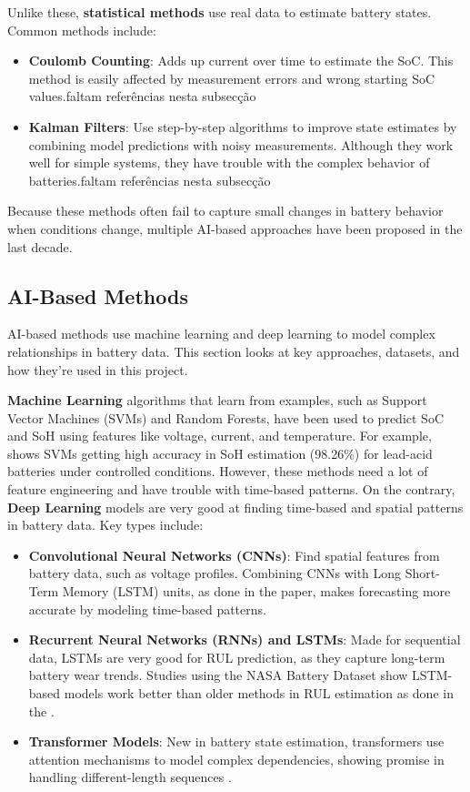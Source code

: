 Unlike these, \textbf{ statistical methods} use real data to estimate battery states. Common methods include:
\begin{itemize}
    \item \textbf{Coulomb Counting}: Adds up current over time to estimate the SoC. This method is easily affected by measurement errors and wrong starting SoC values.\color{Red}faltam referências nesta subsecção\color{Black}
    \item \textbf{Kalman Filters}: Use step-by-step algorithms to improve state estimates by combining model predictions with noisy measurements. Although they work well for simple systems, they have trouble with the complex behavior of batteries.\color{Red}faltam referências nesta subsecção\color{Black}
\end{itemize}

Because these methods often fail to capture small changes in battery behavior when conditions change, multiple AI-based approaches have been proposed in the last decade.

\subsection{AI-Based Methods}
\label{subsec:ai_methods}
AI-based methods use machine learning and deep learning to model complex relationships in battery data. This section looks at key approaches, datasets, and how they're used in this project.

\textbf{Machine Learning} algorithms that learn from examples, such as Support Vector Machines (SVMs) and Random Forests, have been used to predict SoC and SoH using features like voltage, current, and temperature. For example, \cite{sun_simultaneous_2022} shows SVMs getting high accuracy in SoH estimation (98.26\%) for lead-acid batteries under controlled conditions. However, these methods need a lot of feature engineering and have trouble with time-based patterns. On the contrary, \textbf{Deep Learning} models are very good at finding time-based and spatial patterns in battery data. Key types include:
\begin{itemize}
    \item \textbf{Convolutional Neural Networks (CNNs)}: Find spatial features from battery data, such as voltage profiles. Combining CNNs with Long Short-Term Memory (LSTM) units, as done in the \cite{Fangfang_Yang} paper, makes forecasting more accurate by modeling time-based patterns.
    \item \textbf{Recurrent Neural Networks (RNNs) and LSTMs}: Made for sequential data, LSTMs are very good for RUL prediction, as they capture long-term battery wear trends. Studies using the NASA Battery Dataset \cite{noauthor_nasa_nodate} show LSTM-based models work better than older methods in RUL estimation as done in the \cite{hong_state--health_2023}.
    \item \textbf{Transformer Models}: New in battery state estimation, transformers use attention mechanisms to model complex dependencies, showing promise in handling different-length sequences \cite{yilmaz_transformer-based_2025}.
\end{itemize}


